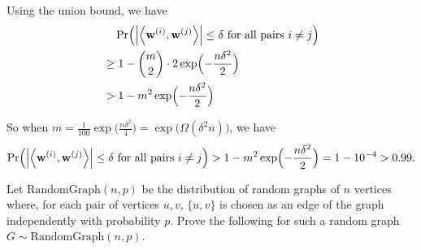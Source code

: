 \documentclass{homework}
\begin{document}
\begin{solution}
  Using the union bound, we have
  \begin{align*}
    & \quad \Pr \Bigl( \left\lvert \left\langle\mathbf{w}^{(i)},\mathbf{w}^{(j)}\right\rangle \right\rvert
    \le \delta \text{ for all pairs } i\ne j \Bigr) \\
    & \ge 1 - \binom{m}{2} \cdot 2 \exp \Bigl( - \frac{n\delta^2}{2} \Bigr) \\
    & > 1 - m^2 \exp \Bigl( - \frac{n\delta^2}{2} \Bigr) \\
  \end{align*}

  So when $m = \frac{1}{100}\exp \bigl( \frac{n\delta^2}{4} \bigr) = \exp \bigl( \Omega(\delta^2 n) \bigr)$,
  we have
  \begin{equation*}
    \Pr \Bigl( \left\lvert \left\langle\mathbf{w}^{(i)},\mathbf{w}^{(j)}\right\rangle \right\rvert
    \le \delta \text{ for all pairs } i\ne j \Bigr)
    > 1 - m^2\exp \Bigl( - \frac{n\delta^2}{2} \Bigr)
    = 1-10^{-4} > 0.99.
  \end{equation*}

\end{solution}

\begin{problem}
  Let $\mathrm{RandomGraph}(n, p)$ be the distribution of random graphs of $n$
  vertices where, for each pair of vertices $u, v$, $\{u, v\}$ is chosen as an
  edge of the graph independently with probability $p$.
  Prove the following for such a random graph
  $G \sim \mathrm{RandomGraph}(n,p)$.
\end{problem}
\end{document}
